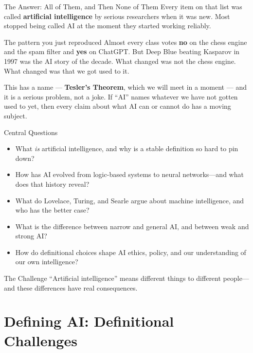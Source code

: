 ﻿\documentclass[aspectratio=169,11pt]{beamer}
\begin{document}
\begin{frame}{The Answer: All of Them, and Then None of Them}
Every item on that list was called \textbf{artificial intelligence} by serious researchers when it was new. Most stopped being called AI at the moment they started working reliably.

\begin{alertblock}{The pattern you just reproduced}
Almost every class votes \textbf{no} on the chess engine and the spam filter and \textbf{yes} on ChatGPT. But Deep Blue beating Kasparov in 1997 was the AI story of the decade. What changed was not the chess engine. What changed was that we got used to it.
\end{alertblock}

This has a name --- \textbf{Tesler's Theorem}, which we will meet in a moment --- and it is a serious problem, not a joke. If ``AI'' names whatever we have not gotten used to yet, then every claim about what AI can or cannot do has a moving subject.
\end{frame}

\begin{frame}{Central Questions}
\begin{itemize}
    \item What \textit{is} artificial intelligence, and why is a stable definition so hard to pin down?
    \item How has AI evolved from logic-based systems to neural networks---and what does that history reveal?
    \item What do Lovelace, Turing, and Searle argue about machine intelligence, and who has the better case?
    \item What is the difference between narrow and general AI, and between weak and strong AI?
    \item How do definitional choices shape AI ethics, policy, and our understanding of our own intelligence?
\end{itemize}

\vspace{0.3cm}
\begin{alertblock}{The Challenge}
``Artificial intelligence'' means different things to different people---and these differences have real consequences.
\end{alertblock}
\end{frame}

\section{Defining AI: Definitional Challenges}
\end{document}
